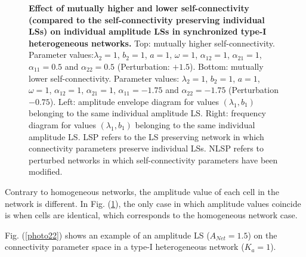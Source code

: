 \begin{figure}[h]
\begin{minipage}{0.45\linewidth}
\begin{center}
\end{center}
\end{minipage} 
   \caption{\textbf{Effect of mutually higher and lower self-connectivity (compared to the self-connectivity preserving individual LSs) on individual amplitude LSs in synchronized type-\textrm{I} heterogeneous networks.} Top: mutually higher self-connectivity. Parameter values:$\lambda_{2}=1$, $b_{2}=1$, $a = 1$, $\omega = 1$, $\alpha_{12}=1$, $\alpha_{21}=1$, $\alpha_{11}=0.5$ and $\alpha_{22}=0.5$ (Perturbation: $+1.5$). Bottom: mutually lower self-connectivity. Parameter values: $\lambda_{2}=1$, $b_{2}=1$, $a = 1$, $\omega = 1$, $\alpha_{12}=1$, $\alpha_{21}=1$, $\alpha_{11}=-1.75$ and $\alpha_{22}=-1.75$ (Perturbation $-0.75$). Left: amplitude  envelope  diagram  for values  $(\lambda_{1},b_{1})$  belonging  to the  same individual  amplitude LS. Right: frequency  diagram  for  values  $(\lambda_{1},b_{1})$ belonging  to  the  same  individual  amplitude LS. LSP refers to the LS preserving network in which connectivity parameters preserve individual LSs. NLSP refers to perturbed networks in which self-connectivity parameters have been modified.}
  \label{photo21}
\end{figure}

Contrary to homogeneous networks, the amplitude value of each cell in the network is different. In Fig. (\ref{photo21}), the only case in which amplitude values coincide is when cells are identical, which corresponds to the homogeneous network case.

Fig. (\ref{photo22}) shows an example of an amplitude LS ($A_{Net} = 1.5$) on the connectivity parameter space in a type-\textrm{I} heterogeneous network ($K_{a}=1$).

